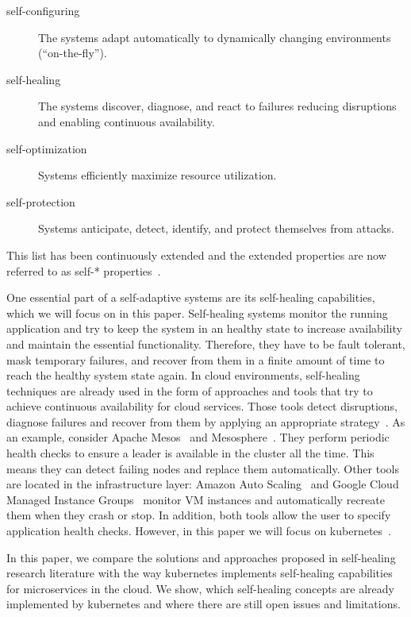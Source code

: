   \begin{description}
    \item[self-configuring] The systems adapt automatically to dynamically changing environments (\enquote{on-the-fly}).
    \item[self-healing] The systems discover, diagnose, and react to failures reducing disruptions and enabling continuous availability.
    \item[self-optimization] Systems efficiently maximize resource utilization.
    \item[self-protection] Systems anticipate, detect, identify, and protect themselves from attacks.
  \end{description}

  This list has been continuously extended and the extended properties are now referred to as self-* properties~\cite{PsaierSurvey}.

  One essential part of a self-adaptive systems are its self-healing capabilities, which we will focus on in this paper.
  Self-healing systems monitor the running application and try to keep the system in an healthy state to increase availability and maintain the essential functionality.
  Therefore, they have to be fault tolerant, mask temporary failures, and recover from them in a finite amount of time to reach the healthy system state again.
  In cloud environments, self-healing techniques are already used in the form of approaches and tools that try to achieve continuous availability for cloud services.
  Those tools detect disruptions, diagnose failures and recover from them by applying an appropriate strategy~\cite{PsaierSurvey}.
  As an example, consider Apache Mesos~\cite{mesos} and Mesosphere~\cite{mesosphere}.
  They perform periodic health checks to ensure a leader is available in the cluster all the time.
  This means they can detect failing nodes and replace them automatically.
  Other tools are located in the infrastructure layer:
  Amazon Auto Scaling~\cite{amazon-auto-scaling} and Google Cloud Managed Instance Groups~\cite{gcp-mig} monitor VM instances and automatically recreate them when they crash or stop.
  In addition, both tools allow the user to specify application health checks.
  However, in this paper we will focus on \gls{kubernetes}~\cite{kubernetes}.

  In this paper, we compare the solutions and approaches proposed in self-healing research literature with the way \gls{kubernetes} implements self-healing capabilities for microservices in the cloud.
  We show, which self-healing concepts are already implemented by \gls{kubernetes} and where there are still open issues and limitations.


